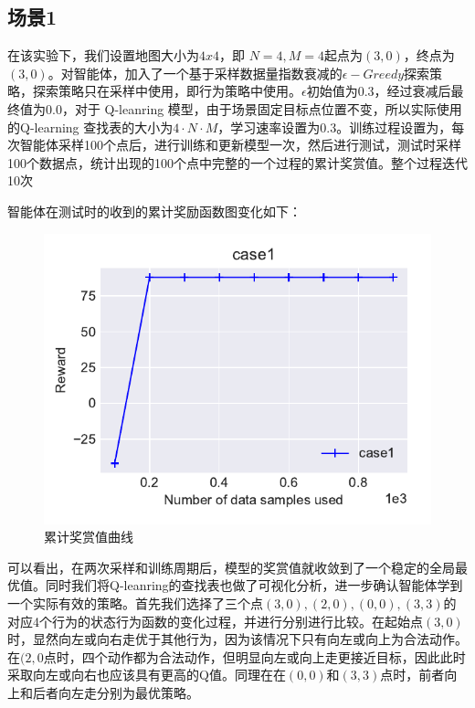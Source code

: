 \documentclass{standalone}
\begin{document}
\subsection{场景1}
在该实验下，我们设置地图大小为$4x4$，即 $N=4, M=4$起点为$(3, 0)$，终点为$(3, 0)$。对智能体，加入了一个基于采样数据量指数衰减的$\epsilon-Greedy$探索策略，探索策略只在采样中使用，即行为策略中使用。$\epsilon$初始值为0.3，经过衰减后最终值为0.0，对于 Q-leanring 模型，由于场景固定目标点位置不变，所以实际使用的Q-learning 查找表的大小为$4\cdot N \cdot M$，学习速率设置为0.3。训练过程设置为，每次智能体采样100个点后，进行训练和更新模型一次，然后进行测试，测试时采样100个数据点，统计出现的100个点中完整的一个过程的累计奖赏值。整个过程迭代10次\par
智能体在测试时的收到的累计奖励函数图变化如下：
\begin{figure}
    \centering
    \includegraphics{pic/case1/case1.pdf}
    \caption{累计奖赏值曲线}
    \label{6-2}
\end{figure}
可以看出，在两次采样和训练周期后，模型的奖赏值就收敛到了一个稳定的全局最优值。同时我们将Q-leanring的查找表也做了可视化分析，进一步确认智能体学到一个实际有效的策略。首先我们选择了三个点$(3, 0), (2, 0), (0, 0), (3,3)$的对应4个行为的状态行为函数的变化过程，并进行分别进行比较。在起始点$(3,0)$时，显然向左或向右走优于其他行为，因为该情况下只有向左或向上为合法动作。在$(2, 0$点时，四个动作都为合法动作，但明显向左或向上走更接近目标，因此此时采取向左或向右也应该具有更高的Q值。同理在在$(0, 0)$和$(3,3)$点时，前者向上和后者向左走分别为最优策略。\par
\end{document}
